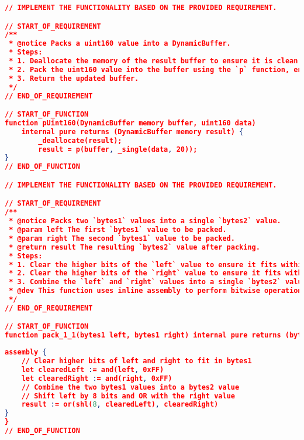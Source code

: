 \begin{figure*}[htbp]
\centering
\begin{lstlisting}[language=json, firstnumber=1, xleftmargin=5.0ex]
// IMPLEMENT THE FUNCTIONALITY BASED ON THE PROVIDED REQUIREMENT.

// START_OF_REQUIREMENT
/**
 * @notice Packs a uint160 value into a DynamicBuffer.
 * Steps:
 * 1. Deallocate the memory of the result buffer to ensure it is clean.
 * 2. Pack the uint160 value into the buffer using the `p` function, ensuring the data is treated as a 20-byte value.
 * 3. Return the updated buffer.
 */
// END_OF_REQUIREMENT

// START_OF_FUNCTION
function pUint160(DynamicBuffer memory buffer, uint160 data)
    internal pure returns (DynamicBuffer memory result) {
        _deallocate(result);
        result = p(buffer, _single(data, 20));
}
// END_OF_FUNCTION

// IMPLEMENT THE FUNCTIONALITY BASED ON THE PROVIDED REQUIREMENT.

// START_OF_REQUIREMENT
/**
 * @notice Packs two `bytes1` values into a single `bytes2` value.
 * @param left The first `bytes1` value to be packed.
 * @param right The second `bytes1` value to be packed.
 * @return result The resulting `bytes2` value after packing.
 * Steps:
 * 1. Clear the higher bits of the `left` value to ensure it fits within the lower 8 bits.
 * 2. Clear the higher bits of the `right` value to ensure it fits within the lower 8 bits.
 * 3. Combine the `left` and `right` values into a single `bytes2` value by shifting and OR-ing them.
 * @dev This function uses inline assembly to perform bitwise operations for efficiency.
 */
// END_OF_REQUIREMENT

// START_OF_FUNCTION
function pack_1_1(bytes1 left, bytes1 right) internal pure returns (bytes2 result) {
\end{lstlisting}
\caption{A 1-shot prompt example}
\label{fig:prompt_template}
\end{figure*}




\begin{figure*}[htbp!]
\centering
\begin{lstlisting}[language=json, firstnumber=1, xleftmargin=2.0ex]
assembly {
    // Clear higher bits of left and right to fit in bytes1
    let clearedLeft := and(left, 0xFF)
    let clearedRight := and(right, 0xFF)
    // Combine the two bytes1 values into a bytes2 value
    // Shift left by 8 bits and OR with the right value
    result := or(shl(8, clearedLeft), clearedRight)
}
}
// END_OF_FUNCTION
\end{lstlisting}
\caption{The LLM output for 1-shot prompt example}
\label{fig:LLM_output_1-shot}
\end{figure*}


